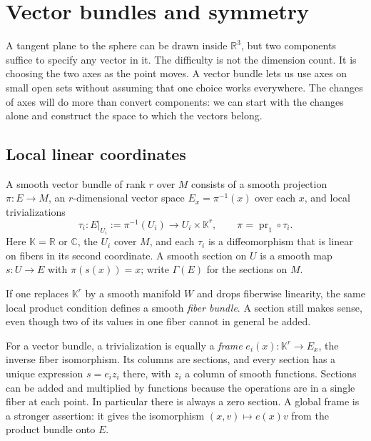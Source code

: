 \chapter{Vector bundles and symmetry}\label{f:bundles}

A tangent plane to the sphere can be drawn inside $\mathbb R^3$, but two components suffice to specify any vector in it. The difficulty is not the dimension count. It is choosing the two axes as the point moves. A vector bundle lets us use axes on small open sets without assuming that one choice works everywhere. The changes of axes will do more than convert components: we can start with the changes alone and construct the space to which the vectors belong.

\section{Local linear coordinates}

\begin{definition}
A smooth vector bundle of rank $r$ over $M$ consists of a smooth projection $\pi:E\to M$, an $r$-dimensional vector space $E_x=\pi^{-1}(x)$ over each $x$, and local trivializations
\[
 \tau_i:E|_{U_i}:=\pi^{-1}(U_i)\longrightarrow U_i\times\mathbb K^r,
 \qquad \pi=\operatorname{pr}_1\circ\tau_i .
\]
Here $\mathbb K=\mathbb R$ or $\mathbb C$, the $U_i$ cover $M$, and each $\tau_i$ is a diffeomorphism that is linear on fibers in its second coordinate. A smooth section on $U$ is a smooth map $s:U\to E$ with $\pi(s(x))=x$; write $\Gamma(E)$ for the sections on $M$.
\end{definition}

If one replaces $\mathbb K^r$ by a smooth manifold $W$ and drops fiberwise linearity, the same local product condition defines a smooth \emph{fiber bundle}. A section still makes sense, even though two of its values in one fiber cannot in general be added.

For a vector bundle, a trivialization is equally a \emph{frame} $e_i(x):\mathbb K^r\to E_x$, the inverse fiber isomorphism. Its columns are sections, and every section has a unique expression $s=e_i z_i$ there, with $z_i$ a column of smooth functions. Sections can be added and multiplied by functions because the operations are in a single fiber at each point. In particular there is always a zero section. A global frame is a stronger assertion: it gives the isomorphism $(x,v)\mapsto e(x)v$ from the product bundle onto $E$.


